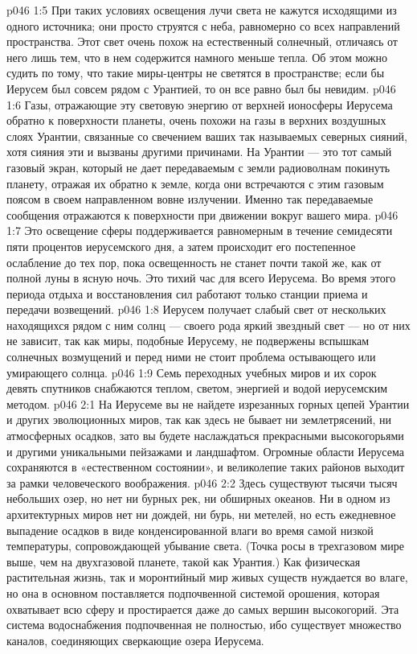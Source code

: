 \vs p046 1:5 При таких условиях освещения лучи света не кажутся исходящими из одного источника; они просто струятся с неба, равномерно со всех направлений пространства. Этот свет очень похож на естественный солнечный, отличаясь от него лишь тем, что в нем содержится намного меньше тепла. Об этом можно судить по тому, что такие миры\hyp{}центры не светятся в пространстве; если бы Иерусем был совсем рядом с Урантией, то он все равно был бы невидим.
\vs p046 1:6 Газы, отражающие эту световую энергию от верхней ионосферы Иерусема обратно к поверхности планеты, очень похожи на газы в верхних воздушных слоях Урантии, связанные со свечением ваших так называемых северных сияний, хотя сияния эти и вызваны другими причинами. На Урантии --- это тот самый газовый экран, который не дает передаваемым с земли радиоволнам покинуть планету, отражая их обратно к земле, когда они встречаются с этим газовым поясом в своем направленном вовне излучении. Именно так передаваемые сообщения отражаются к поверхности при движении вокруг вашего мира.
\vs p046 1:7 Это освещение сферы поддерживается равномерным в течение семидесяти пяти процентов иерусемского дня, а затем происходит его постепенное ослабление до тех пор, пока освещенность не станет почти такой же, как от полной луны в ясную ночь. Это тихий час для всего Иерусема. Во время этого периода отдыха и восстановления сил работают только станции приема и передачи возвещений.
\vs p046 1:8 \pc Иерусем получает слабый свет от нескольких находящихся рядом с ним солнц --- своего рода яркий звездный свет --- но от них не зависит, так как миры, подобные Иерусему, не подвержены вспышкам солнечных возмущений и перед ними не стоит проблема остывающего или умирающего солнца.
\vs p046 1:9 Семь переходных учебных миров и их сорок девять спутников снабжаются теплом, светом, энергией и водой иерусемским методом.
\vs p046 2:1 На Иерусеме вы не найдете изрезанных горных цепей Урантии и других эволюционных миров, так как здесь не бывает ни землетрясений, ни атмосферных осадков, зато вы будете наслаждаться прекрасными высокогорьями и другими уникальными пейзажами и ландшафтом. Огромные области Иерусема сохраняются в «естественном состоянии», и великолепие таких районов выходит за рамки человеческого воображения.
\vs p046 2:2 Здесь существуют тысячи тысяч небольших озер, но нет ни бурных рек, ни обширных океанов. Ни в одном из архитектурных миров нет ни дождей, ни бурь, ни метелей, но есть ежедневное выпадение осадков в виде конденсированной влаги во время самой низкой температуры, сопровождающей убывание света. (Точка росы в трехгазовом мире выше, чем на двухгазовой планете, такой как Урантия.) Как физическая растительная жизнь, так и моронтийный мир живых существ нуждается во влаге, но она в основном поставляется подпочвенной системой орошения, которая охватывает всю сферу и простирается даже до самых вершин высокогорий. Эта система водоснабжения подпочвенная не полностью, ибо существует множество каналов, соединяющих сверкающие озера Иерусема.
